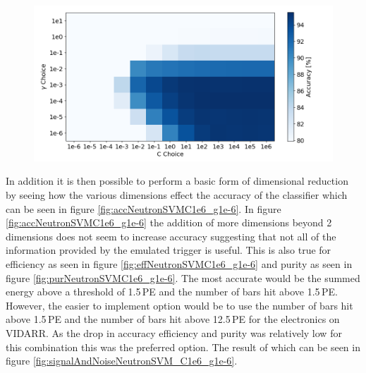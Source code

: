 \begin{figure}[htbp]
\centering
\includegraphics[width=0.9\linewidth]{Chapter4/Figs/Raster/GammaCGridSearchNeutron.png}
\label{fig:GammaCGridSearchNeutron}
\end{figure}

In addition it is then possible to perform a basic form of dimensional reduction by seeing how the various dimensions effect the accuracy of the classifier which can be seen in figure \ref{fig:accNeutronSVMC1e6_g1e-6}. In figure \ref{fig:accNeutronSVMC1e6_g1e-6} the addition of more dimensions beyond 2 dimensions does not seem to increase accuracy suggesting that not all of the information provided by the emulated trigger is useful. This is also true for efficiency as seen in figure \ref{fig:effNeutronSVMC1e6_g1e-6} and purity as seen in figure \ref{fig:purNeutronSVMC1e6_g1e-6}. The most accurate would be the summed energy above a threshold of 1.5\,PE and the number of bars hit above 1.5\,PE. However, the easier to implement option would be to use the number of bars hit above 1.5\,PE and the number of bars hit above 12.5\,PE for the electronics on VIDARR. As the drop in accuracy efficiency and purity was relatively low for this combination this was the preferred option. The result of which can be seen in figure \ref{fig:signalAndNoiseNeutronSVM_C1e6_g1e-6}.

